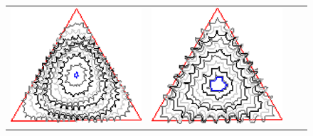 \begin{figure}
\begin{tabular}{p{2.5em}ccc}
\includegraphics[scale=0.24]{figures/chapter6/radius-effect/triangle/improve/len_pen0/radius-5/summary.pdf} &
\includegraphics[scale=0.24]{figures/chapter6/radius-effect/triangle/improve/len_pen0/radius-9/summary.pdf} \\[2em]

\end{tabular}
\end{figure}
